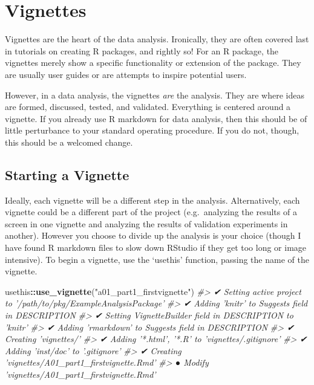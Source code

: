 \documentclass[]{book}
\newenvironment{Shaded}{\begin{snugshade}}{\end{snugshade}}
\newcommand{\CommentTok}[1]{\textcolor[rgb]{0.56,0.35,0.01}{\textit{#1}}}
\newcommand{\KeywordTok}[1]{\textcolor[rgb]{0.13,0.29,0.53}{\textbf{#1}}}
\newcommand{\NormalTok}[1]{#1}
\newcommand{\OperatorTok}[1]{\textcolor[rgb]{0.81,0.36,0.00}{\textbf{#1}}}
\newcommand{\StringTok}[1]{\textcolor[rgb]{0.31,0.60,0.02}{#1}}
\begin{document}
\hypertarget{vignettes}{%
\section{Vignettes}\label{vignettes}}

Vignettes are the heart of the data analysis. Ironically, they are often covered last in tutorials on creating R packages, and rightly so! For an R package, the vignettes merely show a specific functionality or extension of the package. They are usually user guides or are attempts to inspire potential users.

However, in a data analysis, the vignettes \emph{are} the analysis. They are where ideas are formed, discussed, tested, and validated. Everything is centered around a vignette. If you already use R markdown for data analysis, then this should be of little perturbance to your standard operating procedure. If you do not, though, this should be a welcomed change.

\hypertarget{starting-a-vignette}{%
\subsection{Starting a Vignette}\label{starting-a-vignette}}

Ideally, each vignette will be a different step in the analysis. Alternatively, each vignette could be a different part of the project (e.g.~analyzing the results of a screen in one vignette and analyzing the results of validation experiments in another). However you choose to divide up the analysis is your choice (though I have found R markdown files to slow down RStudio if they get too long or image intensive). To begin a vignette, use the `usethis' function, passing the name of the vignette.

\begin{Shaded}
\begin{Highlighting}[]
\NormalTok{usethis}\OperatorTok{::}\KeywordTok{use_vignette}\NormalTok{(}\StringTok{"a01_part1_firstvignette"}\NormalTok{)}
\CommentTok{#> ✔ Setting active project to '/path/to/pkg/ExampleAnalysisPackage'}
\CommentTok{#> ✔ Adding 'knitr' to Suggests field in DESCRIPTION}
\CommentTok{#> ✔ Setting VignetteBuilder field in DESCRIPTION to 'knitr'}
\CommentTok{#> ✔ Adding 'rmarkdown' to Suggests field in DESCRIPTION}
\CommentTok{#> ✔ Creating 'vignettes/'}
\CommentTok{#> ✔ Adding '*.html', '*.R' to 'vignettes/.gitignore'}
\CommentTok{#> ✔ Adding 'inst/doc' to '.gitignore'}
\CommentTok{#> ✔ Creating 'vignettes/A01_part1_firstvignette.Rmd'}
\CommentTok{#> ● Modify 'vignettes/A01_part1_firstvignette.Rmd'}
\end{Highlighting}
\end{Shaded}
\end{document}
